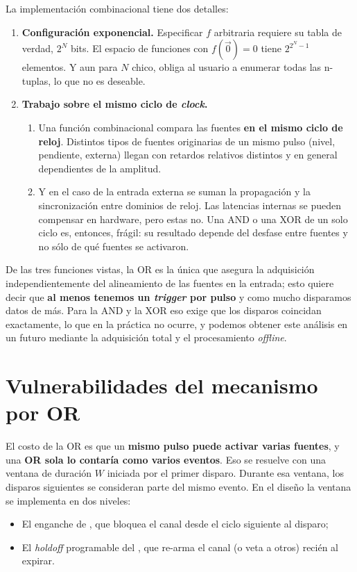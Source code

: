 La implementación combinacional tiene dos detalles:
\begin{enumerate}
  \item \textbf{Configuración exponencial.} Especificar $f$ arbitraria requiere
    su tabla de verdad, $2^N$ bits. El espacio de funciones con $f(\vec 0)=0$
    tiene $2^{2^N-1}$ elementos. Y aun para $N$ chico, obliga al usuario a
    enumerar todas las n-tuplas, lo que no es deseable.
  \item \textbf{Trabajo sobre el mismo ciclo de \emph{clock}.}
  \begin{enumerate}
    \item Una función combinacional compara las fuentes \textbf{en el mismo ciclo
      de reloj}. Distintos tipos de fuentes originarias de un mismo pulso
      (nivel, pendiente, externa) llegan con retardos relativos distintos y en
      general dependientes de la amplitud.
    \item Y en el caso de la entrada externa se suman la propagación y la
      sincronización entre dominios de reloj. Las latencias internas se pueden
      compensar en hardware, pero estas no. Una AND o una XOR de un solo ciclo
      es, entonces, frágil: su resultado depende del desfase entre fuentes y no
      sólo de qué fuentes se activaron.
  \end{enumerate}
\end{enumerate}

De las tres funciones vistas, la OR es la única que asegura la adquisición
independientemente del alineamiento de las fuentes en la entrada; esto quiere
decir que \textbf{al menos tenemos un \emph{trigger} por pulso} y como mucho
disparamos datos de más.
Para la AND y la XOR eso exige que los disparos coincidan exactamente, lo que en
la práctica no ocurre, y podemos obtener este análisis en un futuro mediante la
adquisición total y el procesamiento \emph{offline}.

\section{Vulnerabilidades del mecanismo por OR}
\label{S:mt-vulnerabilidades}

El costo de la OR es que un \textbf{mismo pulso puede activar varias fuentes}, y una \textbf{OR sola lo
contaría como varios eventos}. Eso se resuelve con una
ventana de duración $W$ iniciada por el primer disparo. Durante esa ventana, los
disparos siguientes se consideran parte del mismo evento. En el diseño la
ventana se implementa en dos niveles:
\begin{itemize}
  \item El enganche  de , que
    bloquea el canal desde el ciclo siguiente al disparo;
  \item El \emph{holdoff} programable del , que re-arma el
    canal (o veta a otros) recién al expirar.
\end{itemize}

